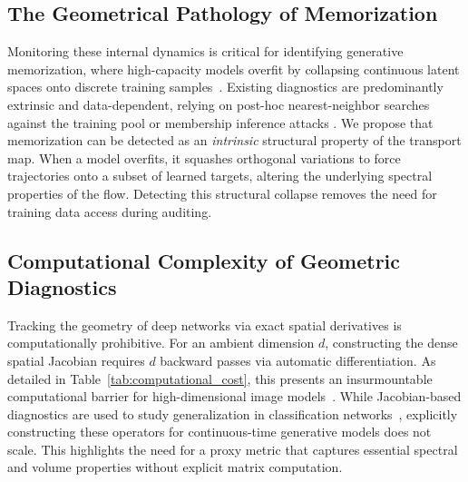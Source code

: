 \documentclass[11pt]{article}
\begin{document}
\subsection{The Geometrical Pathology of Memorization}
Monitoring these internal dynamics is critical for identifying generative memorization, where high-capacity models overfit by collapsing continuous latent spaces onto discrete training samples~\cite{somepalli2023diffusion, carlini2023extracting}. Existing diagnostics are predominantly extrinsic and data-dependent, relying on post-hoc nearest-neighbor searches against the training pool or membership inference attacks \cite{shokri2017membership, feldman2020neural,zhang2017understanding}. We propose that memorization can be detected as an \emph{intrinsic} structural property of the transport map. When a model overfits, it squashes orthogonal variations to force trajectories onto a subset of learned targets, altering the underlying spectral properties of the flow. Detecting this structural collapse removes the need for training data access during auditing.

\subsection{Computational Complexity of Geometric Diagnostics}
Tracking the geometry of deep networks via exact spatial derivatives is computationally prohibitive. For an ambient dimension $d$, constructing the dense spatial Jacobian requires $d$ backward passes via automatic differentiation. As detailed in Table~\ref{tab:computational_cost}, this presents an insurmountable computational barrier for high-dimensional image models~\cite{chen2018neural, grathwohlffjord, griewank2008evaluating, hutchinson1989stochastic, dinh2017density}. While Jacobian-based diagnostics are used to study generalization in classification networks~\cite{novak2018sensitivity}, explicitly constructing these operators for continuous-time generative models does not scale. This highlights the need for a proxy metric that captures essential spectral and volume properties without explicit matrix computation.
\end{document}
